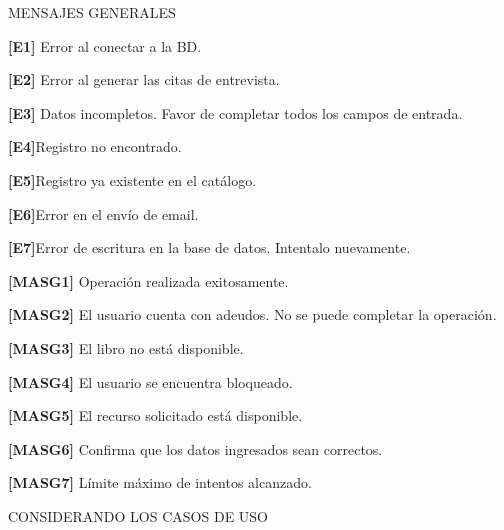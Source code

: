 MENSAJES GENERALES
	\begin{Citemize}
		\item {\bf [E1]} Error al conectar a la BD.
		\item {\bf [E2]} Error al generar las citas de entrevista. 
		\item {\bf [E3]} Datos incompletos. Favor de completar todos los campos de entrada.
	\item {\bf [E4]}Registro no encontrado.
	\item {\bf [E5]}Registro ya existente en el catálogo.
	\item {\bf [E6]}Error en el envío de email.
	\item {\bf [E7]}Error de escritura en la base de datos. Intentalo nuevamente.

	\item {\bf [MASG1]} Operación realizada exitosamente.
	\item {\bf [MASG2]} El usuario cuenta con adeudos. No se puede completar la operación.
	\item {\bf [MASG3]} El libro no está disponible.
	\item {\bf [MASG4]} El usuario se encuentra bloqueado.
	\item {\bf [MASG5]} El recurso solicitado está disponible.
	\item {\bf [MASG6]} Confirma que los datos ingresados sean correctos.
	\item {\bf [MASG7]} Límite máximo de intentos alcanzado.

CONSIDERANDO LOS CASOS DE USO


\end{Citemize}
